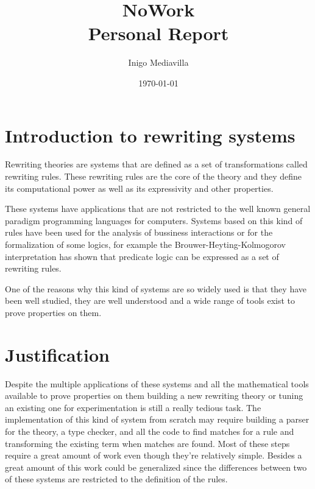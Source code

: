 \documentclass[12pt,a4paper]{article}
\title{NoWork\\ Personal Report}
\author{Inigo Mediavilla\\[2em]}
\date\today
\begin{document}
\maketitle


\section{Introduction to rewriting systems}

Rewriting theories are systems that are defined as a set of transformations called
rewriting rules. These rewriting rules are the core of the theory and
they define its computational power as well as its expressivity and other properties.

These systems have applications that are not restricted to the well known general 
paradigm programming languages for computers. Systems based on this kind of rules have been used for
the analysis of bussiness interactions or for the formalization of
some logics, for example the Brouwer-Heyting-Kolmogorov interpretation has shown that
predicate logic can be expressed as a set of rewriting rules.

One of the reasons why this kind of systems are so widely used is that
they have been well studied, they are well understood and a
wide range of tools exist to prove properties on them.

\section{Justification}

Despite the multiple applications of these systems and all the
mathematical tools available to prove properties on them building a
new rewriting theory or tuning an existing one for experimentation is
still a really tedious task. The implementation of this kind of
system from scratch may require building a parser for the theory, a
type checker, and all the code to find matches for a rule and
transforming the existing term when matches are found. Most of these
steps require a great amount of work even though they're relatively
simple. Besides a great amount of this work could be generalized since
the differences between two of these systems are restricted to the
definition of the rules.
\end{document}
